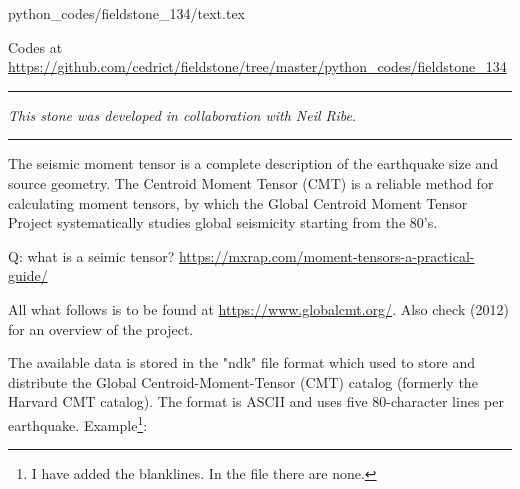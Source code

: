 \begin{flushright} {\tiny {\color{gray} python\_codes/fieldstone\_134/text.tex}} \end{flushright}

%

\begin{center}
\inpython Codes at \url{https://github.com/cedrict/fieldstone/tree/master/python_codes/fieldstone_134}
\end{center}

\par\noindent\rule{\textwidth}{0.4pt}

{\sl This stone was developed in collaboration with Neil Ribe}. 

\par\noindent\rule{\textwidth}{0.4pt}

The seismic moment tensor is a complete description of the earthquake size and source geometry. 
The Centroid Moment Tensor (CMT) is a reliable method for calculating moment tensors, 
by which the Global Centroid Moment Tensor Project systematically studies global seismicity 
starting from the 80's.

Q: what is a seimic tensor? \url{https://mxrap.com/moment-tensors-a-practical-guide/}

All what follows is to be found at \url{https://www.globalcmt.org/}.
Also check \textcite{eknd12} (2012) for an overview of the project.

The available data is stored in the "ndk" file format which used to store
and distribute the Global Centroid-Moment-Tensor (CMT) catalog
(formerly the Harvard CMT catalog).
The format is ASCII and uses five 80-character lines per earthquake. 
Example\footnote{I have added the blanklines. In the file there are none.}:

